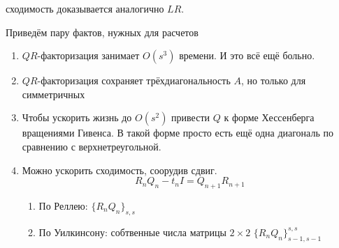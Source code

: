 \documentclass{trlnotes}
\begin{document}
сходимость доказывается аналогично $LR$.

Приведём пару фактов, нужных для расчетов
\begin{enumerate}
  \item $QR$-факторизация занимает $O(s^3)$ времени. И это всё ещё больно.
  \item $QR$-факторизация сохраняет трёхдиагональность $A$, но только для
    симметричных
  \item Чтобы ускорить жизнь до $O(s^2)$  привести $Q$
    к форме Хессенберга вращениями Гивенса.
    В такой форме просто есть ещё одна диагональ по сравнению с
    верхнетреугольной.
  \item Можно ускорить сходимость, соорудив сдвиг.
    \[
      R_n Q_n - t_n I = Q_{n+1} R_{n+1}
    \]
    \begin{enumerate}
      \item По Реллею: $\{R_nQ_n\}_{s,s}$
      \item По Уилкинсону: собтвенные числа матрицы $2 × 2$ $\{R_nQ_n\}^{s,s}_{s-1,s-1}$
    \end{enumerate}
\end{enumerate}
\end{document}
